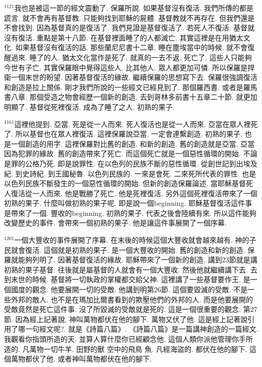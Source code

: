 \documentclass{book}
\begin{document}
$^{1121}$我也是被這一節的經文震動了.
保羅所說.
如果基督沒有復活.
我們所傳的都是謊言.
就不會再有基督教.
只能夠找到耶穌的屍體.
基督教就不再存在.
但我們還是不會找到.
因為基督真的是復活了.
我們見證是基督復活了.
若死人不復活.
基督就沒有復活.
重點是第十八節.
在基督裡面睡了的人都滅亡.
其實這裡是在用猶太文化.
如果基督沒有復活的話.
那些蘭尼尼書十二章.
睡在塵埃當中的時候.
就不會復醒過來.
睡了的人.
猶太文化當作是死了.
就真的一去不返.
死亡了.
這些人只能夠今世有子亡.
其實保羅眼中覺得這些人.
比其他人.
眾人都更加可憐.
所以保羅是捍衛一個末世的盼望.
因著基督復活的緣故.
繼續保羅的思想寫下去.
保羅很強調復活和創造是拉上關係.
剛才我們所說的一些經文已經見到了.
那個羅西書.
或者是羅馬書八章.
那個受造之物會經歷一個新的創造.
去到哥林多前書十五章二十節.
就更加明顯了.
基督從死裡復活.
成為了睡了之人.
初熟的果子.

$^{1161}$這裡他提到.
亞當.
死是從一人而來.
死人復活也是從一人而來.
亞當在眾人裡死了.
所以基督也在眾人裡復活.
這裡保羅說亞當.
一定會連繫創造.
初熟的果子.
也是一個創造的用字.
這裡保羅對比舊的創造.
和新的創造.
舊的創造就是亞當.
亞當因為犯罪的緣故.
舊的創造帶來了死亡.
而這個死亡就是一個惡性循環的開始.
不論是罪的公格乃死.
即是說罪性.
在以色列的民族不斷的惡性循環.
從創世記到出埃及紀.
到史詩紀.
到王國秘魯.
以色列民族的.
一來是會死.
二來死所代表的罪性.
也是以色列民族不斷發生的一個惡性循環的開始.
但新的創造保羅論述.
當耶穌基督死人復活從一人而來.
他是戰勝了死亡.
他是死裡復活.
另外這個死裡復活帶來了一個初熟的果子.
什麼叫做初熟的果子呢.
即是說一個beginning.
耶穌基督復活這件事是帶來了一個.
豐收的beginning.
初熟的果子.
代表之後會陸續有來.
所以這件能夠改變歷史的事件.
會帶來一個初熟的果子.
他是讓這件事展開了一個序幕.

$^{1201}$一個大豐收的事件展開了序幕.
在末後的時候這個大豐收就會越來越有.
神的子民就會復活.
這個就是初熟的果子.
是一個大豐收的開始.
舊的創造和新的創造.
保羅就能夠列明了.
因著基督復活的緣故.
耶穌帶來了一個新的創造.
講到23節就是講初熟的果子基督.
往後就是屬基督的人就會有一個大豐收.
然後他就繼續講下去.
去到末世的時候.
基督將一切執政的掌權都交給父神.
這裡講了一些基督要作王.
是一個國度的觀念.
他要展開一切的受敵.
他講到明第26節.
這個要毀滅的受敵.
不是一些外邦的敵人.
也不是在瑪加比爾書看到的欺壓他們的外邦的人.
而是他要展開的受敵竟然是死亡這件事.
沒了所毀滅的受敵就是死的.
這是一個很重要的觀念.
第27節.
因為經上記著說.
神叫萬物都伏在他的腳下.
萬物又伏了他.
這是經上記著說引用了哪一句經文呢?.
就是《詩篇八篇》.
《詩篇八篇》是一篇講神創造的一篇經文.
我觀看你指頭所造的天.
並算人算什麼你已經顧念他.
這個人類你派他管理你手所造的.
凡萬物一切牛羊.
田野的獸 空中的飛鳥 魚.
凡經海盜的.
都伏在他的腳下.
這個萬物都伏了他.
或者神叫萬物都伏在他的腳下.
\end{document}
